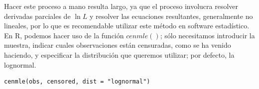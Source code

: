 Hacer este proceso a mano resulta largo, ya que el proceso involucra resolver derivadas parciales de $\ln L$ y resolver las ecuaciones resultantes, generalmente no lineales, por lo que es recomendable utilizar este método en software estadístico. En R, podemos hacer uso de la función $cenmle()$; sólo necesitamos introducir la muestra, indicar cuales observaciones están censuradas, como se ha venido haciendo, y especificar la distribución que queremos utilizar; por defecto, la lognormal.

\begin{verbatim}
cenmle(obs, censored, dist = "lognormal")
\end{verbatim}

